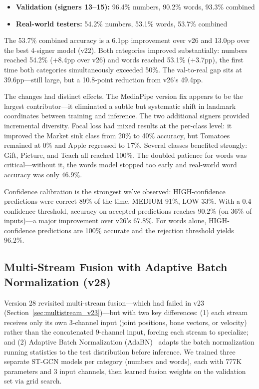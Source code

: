 \documentclass[conference]{IEEEtran}
\begin{document}
\begin{itemize}
    \item \textbf{Validation (signers 13--15):} 96.4\% numbers, 90.2\% words, 93.3\% combined
    \item \textbf{Real-world testers:} 54.2\% numbers, 53.1\% words, 53.7\% combined
\end{itemize}

The 53.7\% combined accuracy is a 6.1pp improvement over v26 and 13.0pp over the best 4-signer model (v22). Both categories improved substantially: numbers reached 54.2\% (+8.4pp over v26) and words reached 53.1\% (+3.7pp), the first time both categories simultaneously exceeded 50\%. The val-to-real gap sits at 39.6pp---still large, but a 10.8-point reduction from v26's 49.4pp.

The changes had distinct effects. The MediaPipe version fix appears to be the largest contributor---it eliminated a subtle but systematic shift in landmark coordinates between training and inference. The two additional signers provided incremental diversity. Focal loss had mixed results at the per-class level: it improved the Market sink class from 20\% to 40\% accuracy, but Tomatoes remained at 0\% and Apple regressed to 17\%. Several classes benefited strongly: Gift, Picture, and Teach all reached 100\%. The doubled patience for words was critical---without it, the words model stopped too early and real-world word accuracy was only 46.9\%.

Confidence calibration is the strongest we've observed: HIGH-confidence predictions were correct 89\% of the time, MEDIUM 91\%, LOW 33\%. With a 0.4 confidence threshold, accuracy on accepted predictions reaches 90.2\% (on 36\% of inputs)---a major improvement over v26's 67.8\%. For words alone, HIGH-confidence predictions are 100\% accurate and the rejection threshold yields 96.2\%.

\subsection{Multi-Stream Fusion with Adaptive Batch Normalization (v28)}
\label{sec:v28}

Version 28 revisited multi-stream fusion---which had failed in v23 (Section~\ref{sec:multistream_v23})---but with two key differences: (1) each stream receives only its own 3-channel input (joint positions, bone vectors, or velocity) rather than the concatenated 9-channel input, forcing each stream to specialize; and (2) Adaptive Batch Normalization (AdaBN)~\cite{li2017adabn} adapts the batch normalization running statistics to the test distribution before inference. We trained three separate ST-GCN models per category (numbers and words), each with 777K parameters and 3 input channels, then learned fusion weights on the validation set via grid search.
\end{document}
